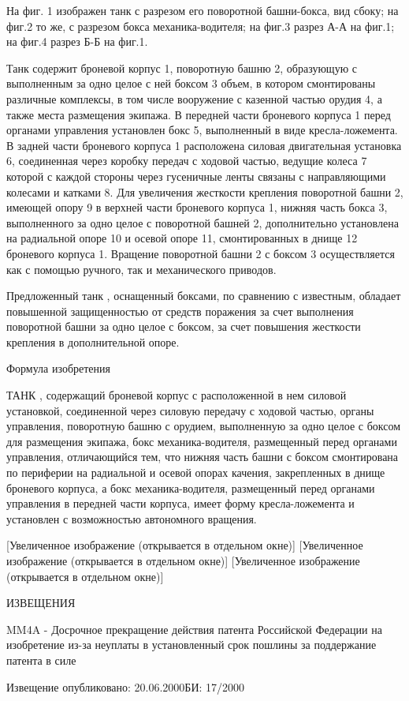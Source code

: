На фиг. 1 изображен танк с разрезом его поворотной башни-бокса, вид сбоку; на фиг.2 то же, с разрезом бокса механика-водителя; на фиг.3 разрез А-А на фиг.1; на фиг.4 разрез Б-Б на фиг.1.

Танк содержит броневой корпус 1, поворотную башню 2, образующую с выполненным за одно целое с ней боксом 3 объем, в котором смонтированы различные комплексы, в том числе вооружение с казенной частью орудия 4, а также места размещения экипажа. В передней части броневого корпуса 1 перед органами управления установлен бокс 5, выполненный в виде кресла-ложемента. В задней части броневого корпуса 1 расположена силовая двигательная установка 6, соединенная через коробку передач с ходовой частью, ведущие колеса 7 которой с каждой стороны через гусеничные ленты связаны с направляющими колесами и катками 8. Для увеличения жесткости крепления поворотной башни 2, имеющей опору 9 в верхней части броневого корпуса 1, нижняя часть бокса 3, выполненного за одно целое с поворотной башней 2, дополнительно установлена на радиальной опоре 10 и осевой опоре 11, смонтированных в днище 12 броневого корпуса 1. Вращение поворотной башни 2 с боксом 3 осуществляется как с помощью ручного, так и механического приводов.

Предложенный танк , оснащенный боксами, по сравнению с известным, обладает повышенной защищенностью от средств поражения за счет выполнения поворотной башни за одно целое с боксом, за счет повышения жесткости крепления в дополнительной опоре.

Формула изобретения

ТАНК , содержащий броневой корпус с расположенной в нем силовой установкой, соединенной через силовую передачу с ходовой частью, органы управления, поворотную башню с орудием, выполненную за одно целое с боксом для размещения экипажа, бокс механика-водителя, размещенный перед органами управления, отличающийся тем, что нижняя часть башни с боксом смонтирована по периферии на радиальной и осевой опорах качения, закрепленных в днище броневого корпуса, а бокс механика-водителя, размещенный перед органами управления в передней части корпуса, имеет форму кресла-ложемента и установлен с возможностью автономного вращения.

[Увеличенное изображение (открывается в отдельном окне)] [Увеличенное изображение (открывается в отдельном окне)] [Увеличенное изображение (открывается в отдельном окне)]

ИЗВЕЩЕНИЯ

MM4A - Досрочное прекращение действия патента Российской Федерации на изобретение из-за неуплаты в установленный срок пошлины за поддержание патента в силе

Извещение опубликовано: 20.06.2000БИ: 17/2000


